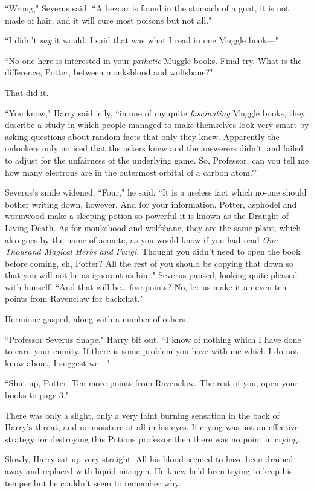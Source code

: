 ``Wrong," Severus said. ``A bezoar is found in the stomach of a goat, it is not made of hair, and it will cure most poisons but not all."

``I didn't \emph{say} it would, I said that was what I read in one Muggle book—"

``No-one here is interested in your \emph{pathetic} Muggle books. Final try. What is the difference, Potter, between monksblood and wolfsbane?"

That did it.

``You know," Harry said icily, ``in one of my quite \emph{fascinating} Muggle books, they describe a study in which people managed to make themselves look very smart by asking questions about random facts that only they knew. Apparently the onlookers only noticed that the askers knew and the answerers didn't, and failed to adjust for the unfairness of the underlying game. So, Professor, can you tell me how many electrons are in the outermost orbital of a carbon atom?"

Severus's smile widened. ``Four," he said. ``It is a useless fact which no-one should bother writing down, however. And for your information, Potter, asphodel and wormwood make a sleeping potion so powerful it is known as the Draught of Living Death. As for monkshood and wolfsbane, they are the same plant, which also goes by the name of aconite, as you would know if you had read \emph{One Thousand Magical Herbs and Fungi.} Thought you didn't need to open the book before coming, eh, Potter? All the rest of you should be copying that down so that you will not be as ignorant as him." Severus paused, looking quite pleased with himself. ``And that will be{\ldots} five points? No, let us make it an even ten points from Ravenclaw for backchat."

Hermione gasped, along with a number of others.

``Professor Severus Snape," Harry bit out. ``I know of nothing which I have done to earn your enmity. If there is some problem you have with me which I do not know about, I suggest we—"

``Shut up, Potter. Ten more points from Ravenclaw. The rest of you, open your books to page 3."

There was only a slight, only a very faint burning sensation in the back of Harry's throat, and no moisture at all in his eyes. If crying was not an effective strategy for destroying this Potions professor then there was no point in crying.

Slowly, Harry sat up very straight. All his blood seemed to have been drained away and replaced with liquid nitrogen. He knew he'd been trying to keep his temper but he couldn't seem to remember why.

